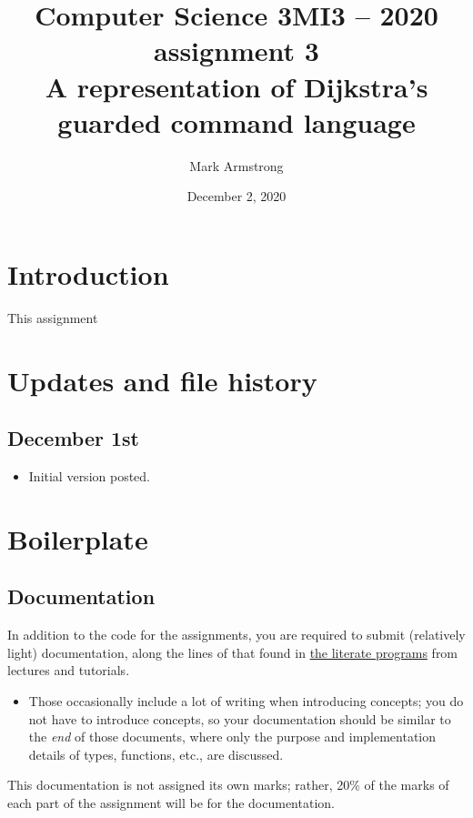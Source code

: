 \documentclass[11pt]{article}
\author{Mark Armstrong}
\date{December 2, 2020}
\title{Computer Science 3MI3 – 2020 assignment 3\\\medskip
\large A representation of Dijkstra's guarded command language}
\theoremstyle{definition}
\begin{document}
\maketitle
\tableofcontents


\section*{Introduction}
\label{sec:org218ac0e}
This assignment 

\section*{Updates and file history}
\label{sec:org5c3a470}
\subsection*{December 1st}
\label{sec:org563183c}
\begin{itemize}
\item Initial version posted.
\end{itemize}

\section*{Boilerplate}
\label{sec:org80be87e}
\subsection*{Documentation}
\label{sec:org0bac481}
In addition to the code for the assignments,
you are required to submit (relatively light) documentation,
along the lines of that found in
\href{https://armkeh.github.io/principles-of-programming-languages/\#outline-container-Lecture-literate-programs}{the literate programs}
from lectures and tutorials.
\begin{itemize}
\item Those occasionally include a lot of writing when introducing concepts;
you do not have to introduce concepts, so your documentation
should be similar to the \emph{end} of those documents,
where only the purpose and implementation details
of types, functions, etc., are discussed.
\end{itemize}

This documentation is not assigned its own marks;
rather, 20\% of the marks of each part of the assignment
will be for the documentation.
\end{document}
